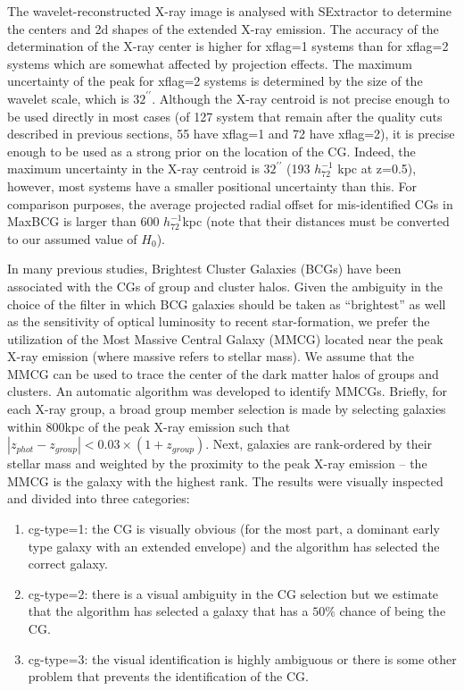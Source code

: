 \documentclass[12pt]{emulateapj}
\newcommand{\pgroup}{127 }      %
\begin{document}
The wavelet-reconstructed X-ray image is analysed with SExtractor
\citep{Bertin:1996} to determine the centers and 2d shapes of the
extended X-ray emission. The accuracy of the determination of the
X-ray center is higher for {\sc xflag}=1 systems than for {\sc
  xflag}=2 systems which are somewhat affected by projection
effects. The maximum uncertainty of the peak for {\sc xflag}=2 systems
is determined by the size of the wavelet scale, which is
$32^{\prime\prime}$. Although the X-ray centroid is not precise enough
to be used directly in most cases (of \pgroup system that remain after
the quality cuts described in previous sections, 55 have {\sc xflag}=1
and 72 have {\sc xflag}=2), it is precise enough to be used as a
strong prior on the location of the CG. Indeed, the maximum
uncertainty in the X-ray centroid is $32^{\prime\prime}$ (193
$h_{72}^{-1}$ kpc at z=0.5), however, most systems have a smaller
positional uncertainty than this. For comparison
purposes, the average projected radial offset for mis-identified CGs
in MaxBCG is larger than 600 $h_{72}^{-1}$kpc \citep[Figure
5,][]{Johnston:2007} (note that their distances must be converted to
our assumed value of $H_0$).

In many previous studies, Brightest Cluster Galaxies (BCGs) have been
associated with the CGs of group and cluster halos. Given the
ambiguity in the choice of the filter in which BCG galaxies should be
taken as ``brightest'' as well as the sensitivity of optical
luminosity to recent star-formation, we prefer the utilization of the
Most Massive Central Galaxy (MMCG) located near the peak X-ray
emission (where massive refers to stellar mass). We assume that the
MMCG can be used to trace the center of the dark matter halos of
groups and clusters. An automatic algorithm was developed to identify
MMCGs. Briefly, for each X-ray group, a broad group member selection
is made by selecting galaxies within 800kpc of the peak X-ray
emission such that $|z_{phot}-z_{group}|< 0.03 \times
(1+z_{group})$. Next, galaxies are rank-ordered by their stellar mass
and weighted by the proximity to the peak X-ray emission -- the MMCG
is the galaxy with the highest rank. The results were visually
inspected and divided into three categories:

\begin{enumerate}
\item {\sc cg-type}=1: the CG is visually obvious (for the most part,
  a dominant early type galaxy with an extended envelope) and the
  algorithm has selected the correct galaxy.
\item {\sc cg-type}=2: there is a visual ambiguity in the CG selection
  but we estimate that the algorithm has selected a galaxy that has a
  $50\%$ chance of being the CG.
\item {\sc cg-type}=3: the visual identification is highly ambiguous
  or there is some other problem that prevents the identification of
  the CG.
\end{enumerate}
\end{document}
